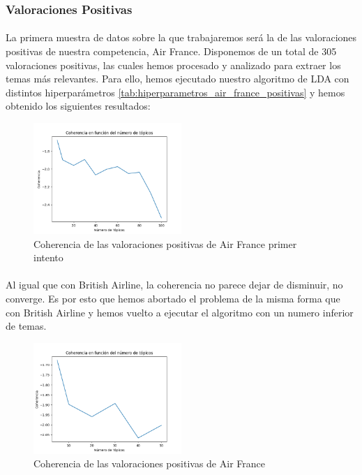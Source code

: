 \documentclass{report}
\begin{document}
{{                \subsubsection*{Valoraciones Positivas}
                    \paragraph*{}{
                        La primera muestra de datos sobre la que trabajaremos será la de las valoraciones positivas de nuestra competencia, Air France.
                        Disponemos de un total de 305 valoraciones positivas, las cuales hemos procesado y analizado para extraer los temas más relevantes.
                        Para ello, hemos ejecutado nuestro algoritmo de LDA con distintos hiperparámetros \ref{tab:hiperparametros_air_france_positivas} y hemos obtenido los siguientes resultados:
                    }
                    \begin{figure}[H]
                        \centering
                        \includegraphics[width=0.5\textwidth]{./img/air_france_positivas1.png}
                        \caption{Coherencia de las valoraciones positivas de Air France primer intento}
                    \end{figure}
                    \paragraph*{}{
                        Al igual que con British Airline, la coherencia no parece dejar de disminuir, no converge.
                        Es por esto que hemos abortado el problema de la misma forma que con British Airline y hemos vuelto a ejecutar el algoritmo con un numero inferior de temas.
                    }
                    \begin{figure}[H]
                        \centering
                        \includegraphics[width=0.5\textwidth]{./img/air_france_positivas2.png}
                        \caption{Coherencia de las valoraciones positivas de Air France}
                    \end{figure}
}}
\end{document}
